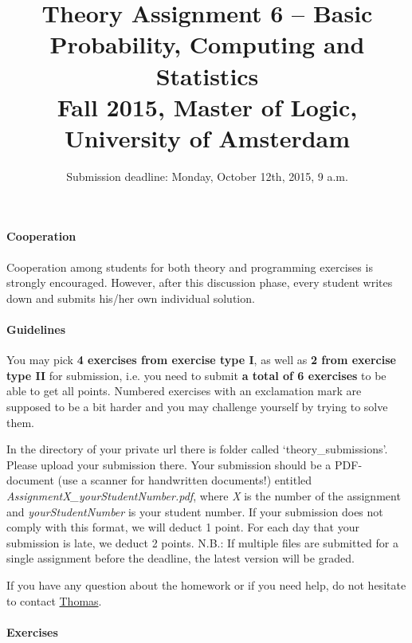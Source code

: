 \documentclass{article}
\title{Theory Assignment 6 -- Basic Probability, Computing and Statistics\\[2mm]
\large{Fall 2015, Master of Logic, University of Amsterdam}}
\author{}
\date{Submission deadline: Monday, October 12th, 2015, 9 a.m.}
\begin{document}
\maketitle

\paragraph{Cooperation}
Cooperation among students for both theory and programming exercises
is strongly encouraged.  However, after this discussion phase, every student writes down and submits his/her own individual solution.

\paragraph{Guidelines}
You may pick {\bf 4 exercises from exercise type I}, as well as {\bf 2 from exercise type II} for submission, i.e. you need to submit {\bf a total of 6 exercises} to be able to get all points. Numbered exercises with an exclamation mark are supposed to be a bit harder and you may challenge yourself by trying to solve them.

In the directory of your private url there is folder called `theory\_submissions'. Please upload your submission there. Your submission should be a PDF-document (use a scanner for handwritten documents!) entitled \textit{AssignmentX\_yourStudentNumber.pdf}, where \textit{X} is the number of the assignment and \textit{yourStudentNumber} is your student number. If your submission does not comply with this format, we will deduct 1 point. For each day that your submission is late, we deduct 2 points. N.B.: If multiple files are submitted for a single assignment before the deadline, the latest version will be graded.

If you have any question about the homework or if you need help, do not hesitate to contact \href{mailto:T.S.Brochhagen@uva.nl}{Thomas}.

\paragraph{Exercises}
\end{document}
